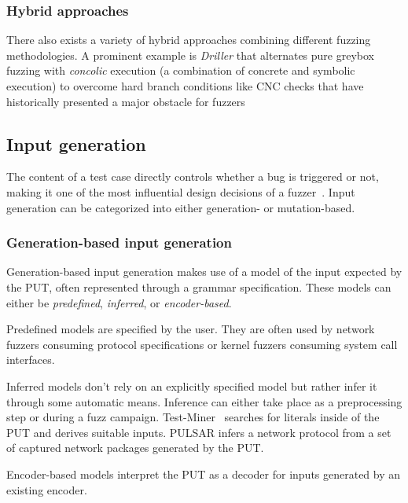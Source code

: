 \subsubsection{Hybrid approaches}

There also exists a variety of hybrid approaches combining different fuzzing methodologies.
A prominent example is \emph{Driller} that alternates pure greybox fuzzing with
\emph{concolic} execution (a combination of concrete and symbolic execution) to overcome hard branch
conditions like CNC checks that have historically presented a major obstacle for fuzzers~\cite{stephens_driller_2016}

\subsection{Input generation}\label{sec:fuzzing-input-generation}


The content of a test case directly controls whether a bug is triggered or not, making
it one of the most influential design decisions of a fuzzer~\cite{manes_art_2019}.
Input generation can be categorized into either generation- or mutation-based.

\subsubsection{Generation-based input generation}

Generation-based input generation makes use of a model of the input expected by
the PUT, often represented through a grammar specification.
These models can either be \emph{predefined}, \emph{inferred}, or \emph{encoder-based}.

Predefined models are specified by the user.
They are often used by network fuzzers consuming protocol specifications or kernel fuzzers
consuming system call interfaces.

Inferred models don't rely on an explicitly specified model but rather infer it through some automatic means.
Inference can either take place as a preprocessing step or during a fuzz campaign.
Test-Miner~\cite{toffola_saying_2017} searches for literals inside of the PUT and derives suitable inputs.
PULSAR\cite{thuraisingham_pulsar_2015} infers a network protocol from a set of captured network packages generated by the PUT.

Encoder-based models interpret the PUT as a decoder for inputs generated by an existing encoder.

